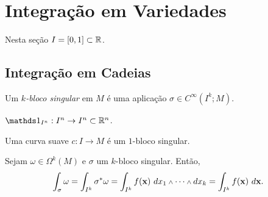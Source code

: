\section{Integração em Variedades}

\begin{note}
    Nesta seção \(I = [0,1]\subset \mathbb{R}\). 
\end{note}

\subsection{Integração em Cadeias}

\begin{definition}
    Um \(k\)\emph{-bloco singular} em \(M\) é uma aplicação \(\sigma \in C^\infty(I^k; M)\).
\end{definition}

\begin{example}
    \(\id_{I^n} : I^n \to I^n \subset \R^n \). 
\end{example}
\begin{example}%
    Uma curva suave \(c : I \to M \) é um \(1\)-bloco singular. 
\end{example}


\begin{definition}
    Sejam \(\omega \in \Omega^k(M)\) e \(\sigma \) um $k$-bloco singular. Então,  
    \[\int_\sigma \omega = \int_{I^k} \sigma^*\omega = \int_{I^k}f(\x) \ dx_1\wedge \cdots \wedge dx_k =\int_{I^k} f(\x) \ d\x. \]  
\end{definition}


